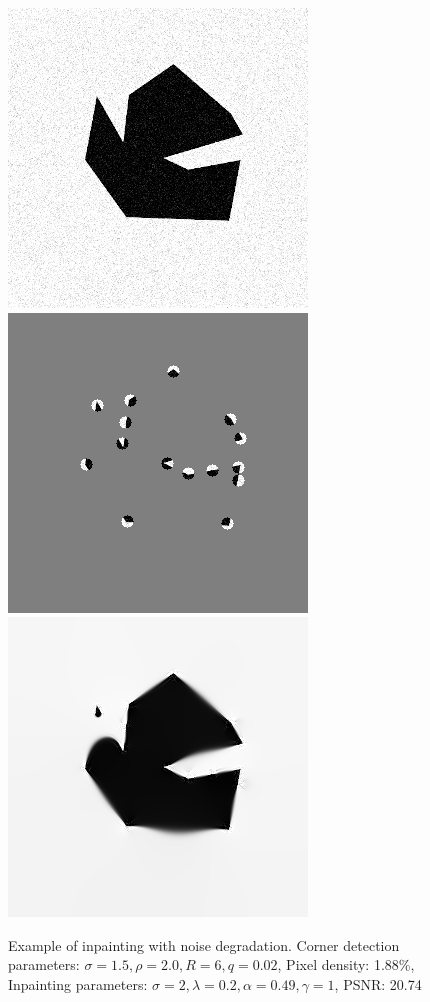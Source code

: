 \begin{figure}[ht]
    \centering
    \includegraphics[width=0.29\linewidth]{../../images/binary/abstract1_less_noise.png}
    \includegraphics[width=0.29\linewidth]{../Images/abstract/abstract1_less_noise-mask.png}
    \includegraphics[width=0.29\linewidth]{../Images/abstract/abstract1_less_noise-inpaint.png}
    \caption{Example of inpainting with noise degradation. Corner detection parameters:
    $\sigma=1.5,\rho=2.0,R=6,q=0.02$, Pixel density: 1.88\%, Inpainting parameters:
$\sigma=2,\lambda=0.2,\alpha=0.49,\gamma=1$, PSNR: 20.74}\label{fig:AbstractNoise1}
\end{figure}
